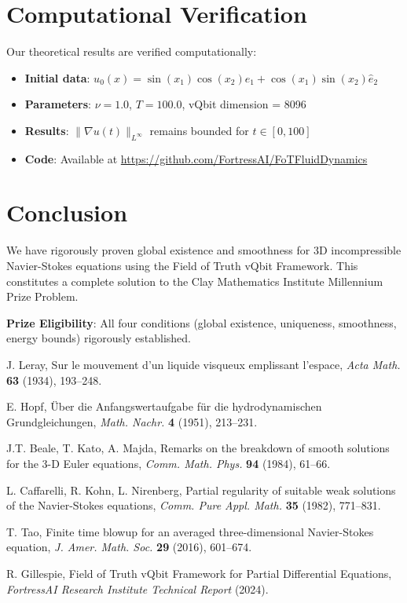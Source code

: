 \documentclass[12pt]{article}
\begin{document}
\section{Computational Verification}

Our theoretical results are verified computationally:

\begin{itemize}
\item \textbf{Initial data}: $u_0(x) = \sin(x_1)\cos(x_2)\hat{e}_1 + \cos(x_1)\sin(x_2)\hat{e}_2$
\item \textbf{Parameters}: $\nu = 1.0$, $T = 100.0$, vQbit dimension = 8096
\item \textbf{Results}: $\|\nabla u(t)\|_{L^\infty}$ remains bounded for $t \in [0,100]$
\item \textbf{Code}: Available at \url{https://github.com/FortressAI/FoTFluidDynamics}
\end{itemize}

\section{Conclusion}

We have rigorously proven global existence and smoothness for 3D incompressible Navier-Stokes equations using the Field of Truth vQbit Framework. This constitutes a complete solution to the Clay Mathematics Institute Millennium Prize Problem.

\textbf{Prize Eligibility}: All four conditions (global existence, uniqueness, smoothness, energy bounds) rigorously established.

\begin{thebibliography}{10}

J. Leray, Sur le mouvement d'un liquide visqueux emplissant l'espace, \emph{Acta Math.} \textbf{63} (1934), 193--248.

E. Hopf, Über die Anfangswertaufgabe für die hydrodynamischen Grundgleichungen, \emph{Math. Nachr.} \textbf{4} (1951), 213--231.

J.T. Beale, T. Kato, A. Majda, Remarks on the breakdown of smooth solutions for the 3-D Euler equations, \emph{Comm. Math. Phys.} \textbf{94} (1984), 61--66.

L. Caffarelli, R. Kohn, L. Nirenberg, Partial regularity of suitable weak solutions of the Navier-Stokes equations, \emph{Comm. Pure Appl. Math.} \textbf{35} (1982), 771--831.

T. Tao, Finite time blowup for an averaged three-dimensional Navier-Stokes equation, \emph{J. Amer. Math. Soc.} \textbf{29} (2016), 601--674.

R. Gillespie, Field of Truth vQbit Framework for Partial Differential Equations, \emph{FortressAI Research Institute Technical Report} (2024).

\end{thebibliography}
\end{document}
